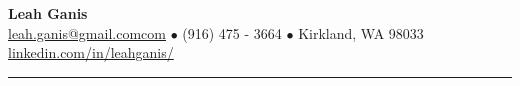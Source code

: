 \documentclass[letterpaper, onecolumn, oneside]{article}
\begin{document}

\begin{center}

{\Large \bfseries Leah Ganis}\\[4pt]
\href{mailto:leah.ganis@gmail.com}{leah.ganis@gmail.comcom} $\bullet$ (916) 475 - 3664 $\bullet$ Kirkland, WA 98033 \\
\url{linkedin.com/in/leahganis/}  %

\textcolor{litegrey}{\rule{\textwidth}{.1pt}}

\end{center}
\end{document}
